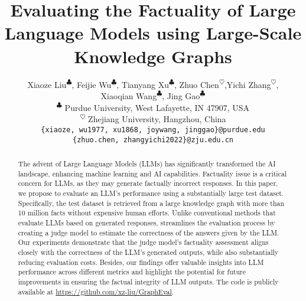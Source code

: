 \documentclass[11pt,dvipdfm]{article}
\title{Evaluating the Factuality of Large Language Models using Large-Scale Knowledge Graphs}
\author{Xiaoze Liu\textsuperscript{$\clubsuit$}, Feijie Wu\textsuperscript{$\clubsuit$}, Tianyang Xu\textsuperscript{$\clubsuit$}, Zhuo Chen\textsuperscript{$\heartsuit$},Yichi Zhang\textsuperscript{$\heartsuit$}, \\ Xiaoqian Wang\textsuperscript{$\clubsuit$}, Jing Gao\textsuperscript{$\clubsuit$}\\
\textsuperscript{$\clubsuit$} Purdue University,
West Lafayette, IN 47907, USA \\
\textsuperscript{$\heartsuit$} Zhejiang University, Hangzhou, China\\
\texttt{\{xiaoze, wu1977, xu1868, joywang, jinggao\}@purdue.edu} \\
\texttt{\{zhuo.chen, zhangyichi2022\}@zju.edu.cn}
}
\begin{document}
\maketitle

\begin{abstract}
The advent of Large Language Models (LLMs) has significantly transformed the AI landscape, enhancing machine learning and AI capabilities. Factuality issue is a critical concern for LLMs, as they may generate factually incorrect responses.
In this paper, we propose \GraphEval{} to evaluate an LLM's performance using a substantially large test dataset. Specifically, the test dataset is retrieved from a large knowledge graph with more than 10 million facts without expensive human efforts. Unlike conventional methods that evaluate LLMs based on generated responses, \GraphEval{} streamlines the evaluation process by creating a judge model to estimate the correctness of the answers given by the LLM. Our experiments demonstrate that the judge model's factuality assessment aligns closely with the correctness of the LLM's generated outputs, while also substantially reducing evaluation costs.  Besides, our findings offer valuable insights into LLM performance across different metrics and highlight the potential for future improvements in ensuring the factual integrity of LLM outputs. The code is publicly available at \url{https://github.com/xz-liu/GraphEval}.



\end{abstract}





 


%  
% 

\appendix

\end{document}
